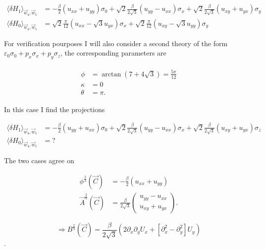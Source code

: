 \documentclass[../../../main.tex]{subfiles}
\begin{document}
\begin{align}
	\langle\delta  H_{1} \rangle_{\vec{w}_4, \vec{w}_5} &= -\frac{\beta}{2}( u_{xx} + u_{yy})\sigma_0 + \sqrt{2} \frac{\beta}{2\sqrt{3}}(u_{yy}-u_{xx})\sigma_x + \sqrt{2} \frac{\beta}{2\sqrt{3}}(u_{xy} + u_{yx}) \sigma_y\\
	\langle \delta H_0 \rangle_{\vec{w}_4, \vec{w}_5} &= \sqrt{2}\frac{\pi}{12}(u_{xx} - \sqrt{3}u_{yx})\sigma_x + \sqrt{2}\frac{\pi}{12}(u_{xy} - \sqrt{3} u_{yy})\sigma_y
\end{align}

For verification pourposes I will also consider a second theory of the form $\varepsilon_0\sigma_0 + p_x\sigma_x + p_y\sigma_z$, the corresponding parameters are

\begin{align}
	\begin{split}
		\phi &= \arctan(7+4\sqrt{3}) = \frac{5\pi}{12} \\
		\kappa &= 0 \\
		\theta &= \pi.
	\end{split}
\end{align}

In this case I find the projections 

\begin{align}
	\langle \delta H_1 \rangle_{\vec{w}_4, \vec{w}_5} &= -\frac{\beta}{2}(u_{yy}+u_{xx}) \sigma_0 + \sqrt{2} \frac{\beta}{2 \sqrt{3}}(u_{yy}-u_{xx})\sigma_x + \sqrt{2} \frac{\beta}{2\sqrt{3}}(u_{xy} + u_{yx}) \sigma_z \\
	\langle \delta H_0 \rangle_{\vec{w}_4, \vec{w}_5} &= ?
\end{align}

The two cases agree on 

\begin{align}
	\phi^{\frac23}(\vec{C}) &= -\frac{\beta}{2}(u_{xx} + u_{yy}) \\
	\vec{A}^{\frac23}(\vec{C}) &= \frac{\beta}{2\sqrt{3}}
	\begin{pmatrix}
		u_{yy} - u_{xx} \\
		u_{xy} + u_{yx}
	\end{pmatrix}.
\end{align}


\begin{equation}
	\Rightarrow B^{\frac23}(\vec{C}) = \frac{\beta}{2\sqrt{3}} \left(2\partial_x\partial_yU_x +\left[\partial_x^2 - \partial_y^2\right]U_y\right)
\end{equation}.
\end{document}
